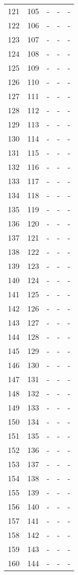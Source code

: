 \documentclass[10pt]{article}
\begin{document}
\begin {longtable}{l r r r r}
121 & 105 & - & - & - \\
122 & 106 & - & - & - \\
123 & 107 & - & - & - \\
124 & 108 & - & - & - \\
125 & 109 & - & - & - \\
126 & 110 & - & - & - \\
127 & 111 & - & - & - \\
128 & 112 & - & - & - \\
129 & 113 & - & - & - \\
130 & 114 & - & - & - \\
131 & 115 & - & - & - \\
132 & 116 & - & - & - \\
133 & 117 & - & - & - \\
134 & 118 & - & - & - \\
135 & 119 & - & - & - \\
136 & 120 & - & - & - \\
137 & 121 & - & - & - \\
138 & 122 & - & - & - \\
139 & 123 & - & - & - \\
140 & 124 & - & - & - \\
141 & 125 & - & - & - \\
142 & 126 & - & - & - \\
143 & 127 & - & - & - \\
144 & 128 & - & - & - \\
145 & 129 & - & - & - \\
146 & 130 & - & - & - \\
147 & 131 & - & - & - \\
148 & 132 & - & - & - \\
149 & 133 & - & - & - \\
150 & 134 & - & - & - \\
151 & 135 & - & - & - \\
152 & 136 & - & - & - \\
153 & 137 & - & - & - \\
154 & 138 & - & - & - \\
155 & 139 & - & - & - \\
156 & 140 & - & - & - \\
157 & 141 & - & - & - \\
158 & 142 & - & - & - \\
159 & 143 & - & - & - \\
160 & 144 & - & - & - \\

\end{longtable}
\end{document}

